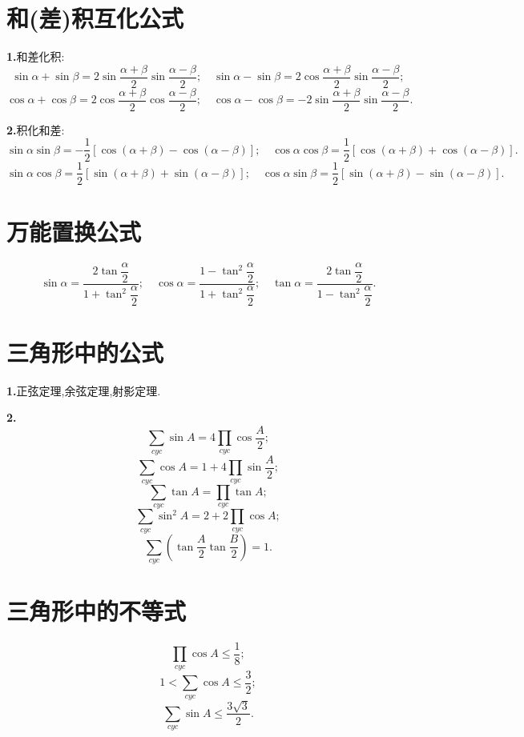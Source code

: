 \documentclass{article}
\begin{document}
\section{{\large 和(差)积互化公式}}

\textbf{1.}和差化积:
\[\sin\alpha+\sin\beta=2\sin\frac{\alpha+\beta}{2}\sin\frac{\alpha-\beta}{2};\quad\sin\alpha-\sin\beta=2\cos\frac{\alpha+\beta}{2}\sin\frac{\alpha-\beta}{2};\]
\[\cos\alpha+\cos\beta=2\cos\frac{\alpha+\beta}{2}\cos\frac{\alpha-\beta}{2};\quad\cos\alpha-\cos\beta=-2\sin\frac{\alpha+\beta}{2}\sin\frac{\alpha-\beta}{2}.\]
\par\textbf{2.}积化和差:
\[\sin\alpha\sin\beta=-\frac{1}{2}[\cos(\alpha+\beta)-\cos(\alpha-\beta)];\quad\cos\alpha\cos\beta=\frac{1}{2}[\cos(\alpha+\beta)+\cos(\alpha-\beta)].\]
\[\sin\alpha\cos\beta=\frac{1}{2}[\sin(\alpha+\beta)+\sin(\alpha-\beta)];\quad\cos\alpha\sin\beta=\frac{1}{2}[\sin(\alpha+\beta)-\sin(\alpha-\beta)].\]
\section{{\large 万能置换公式}}\vspace{-0.75cm}

\[\sin\alpha=\frac{2\tan\dfrac{\alpha}{2}}{1+\tan^2\dfrac{\alpha}{2}};\quad\cos\alpha=\frac{1-\tan^2\dfrac{\alpha}{2}}{1+\tan^2\dfrac{\alpha}{2}};\quad\tan\alpha=\frac{2\tan\dfrac{\alpha}{2}}{1-\tan^2\dfrac{\alpha}{2}}.\]
\section{{\large 三角形中的公式}}
\textbf{1.}正弦定理,余弦定理,射影定理.
\par\textbf{2.}
\[\sum\limits_{cyc}\sin A=4\prod\limits_{cyc} \cos\frac{A}{2};\]
\[\sum\limits_{cyc}\cos A=1+4\prod\limits_{cyc} \sin\frac{A}{2};\]
\[\sum\limits_{cyc}\tan A=\prod\limits_{cyc}\tan A;\]
\[\sum\limits_{cyc}\sin^2A=2+2\prod\limits_{cyc}\cos A;\]
\[\sum\limits_{cyc}\left(\tan\frac{A}{2}\tan\frac{B}{2}\right)=1.\]
\section{{\large 三角形中的不等式}}
\[\prod\limits_{cyc}\cos A\le\frac{1}{8};\]
\[1<\sum\limits_{cyc}\cos A\le\frac{3}{2};\]
\[\sum\limits_{cyc}\sin A\le\frac{3\sqrt{3}}{2}.\]
\end{document}
